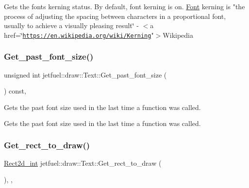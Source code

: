 Gets the font\textquotesingle{}s kerning status. By default, font kerning is on. \hyperlink{classjetfuel_1_1draw_1_1Font}{Font} kerning is "the process of adjusting the spacing between characters in a proportional font, usually to achieve a visually pleasing result\char`\"{}
-\/ $<$a href=\char`\"{}\href{https://en.wikipedia.org/wiki/Kerning}{\tt https\+://en.\+wikipedia.\+org/wiki/\+Kerning}"$>$Wikipedia \mbox{\label{classjetfuel_1_1draw_1_1Text_ab24383675fab628744a31d8d95934d6f}} 
\subsubsection{\texorpdfstring{Get\+\_\+past\+\_\+font\+\_\+size()}{Get\_past\_font\_size()}}
{\footnotesize\ttfamily unsigned int jetfuel\+::draw\+::\+Text\+::\+Get\+\_\+past\+\_\+font\+\_\+size (\begin{DoxyParamCaption}{ }\end{DoxyParamCaption}) const\hspace{0.3cm}{\ttfamily [inline]}, {\ttfamily [protected]}}



Gets the past font size used in the last time a function was called. 

Gets the past font size used in the last time a function was called. \mbox{\label{classjetfuel_1_1draw_1_1Text_a362996e996d471729944eebdff1f7636}} 
\subsubsection{\texorpdfstring{Get\+\_\+rect\+\_\+to\+\_\+draw()}{Get\_rect\_to\_draw()}}
{\footnotesize\ttfamily \hyperlink{classjetfuel_1_1draw_1_1Rect2d}{Rect2d\+\_\+int} jetfuel\+::draw\+::\+Text\+::\+Get\+\_\+rect\+\_\+to\+\_\+draw (\begin{DoxyParamCaption}{ }\end{DoxyParamCaption})\hspace{0.3cm}{\ttfamily [inline]}, {\ttfamily [override]}, {\ttfamily [virtual]}}



